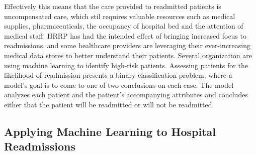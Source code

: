 \documentclass[sigconf]{acmart}
\begin{document}
Effectively this means that the care provided to readmitted patients is uncompensated care, which stil requires valuable resources such as medical supplies, pharmaceuticals, the occupancy of hospital bed and the attention of medical staff. HRRP has had the intended effect of bringing increased focus to readmissions, and some healthcare providers are leveraging their ever-increasing medical data stores to better understand their patients. Several organization are using machine learning to identify high-risk patients. Assessing patients for the likelihood of readmission presents a binary classification problem, where a model's goal is to come to one of two conclusions on each case. The model analyzes each patient and the patient's accompanying attributes and concludes either that the patient will be readmitted or will not be readmitted.

\subsection{Applying Machine Learning to Hospital Readmissions}
\end{document}
